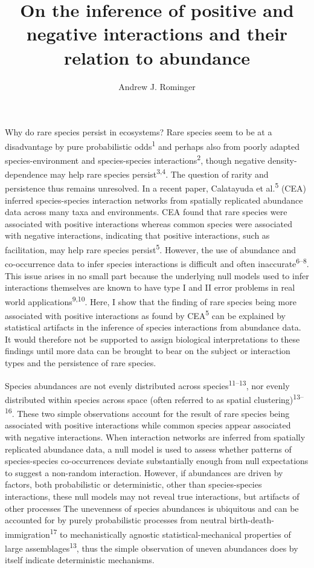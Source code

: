 \documentclass[]{article}
\title{On the inference of positive and negative interactions and their
relation to abundance}
\author{Andrew J. Rominger}
\date{}
\begin{document}
\maketitle

Why do rare species persist in ecosystems? Rare species seem to be at a
disadvantage by pure probabilistic odds\textsuperscript{1} and perhaps
also from poorly adapted species-environment and species-species
interactions\textsuperscript{2}, though negative density-dependence may
help rare species persist\textsuperscript{3,4}. The question of rarity
and persistence thus remains unresolved. In a recent paper, Calatayuda
et al.\textsuperscript{5} (CEA) inferred species-species interaction
networks from spatially replicated abundance data across many taxa and
environments. CEA found that rare species were associated with positive
interactions whereas common species were associated with negative
interactions, indicating that positive interactions, such as
facilitation, may help rare species persist\textsuperscript{5}. However,
the use of abundance and co-occurrence data to infer species
interactions is difficult and often inaccurate\textsuperscript{6--8}.
This issue arises in no small part because the underlying null models
used to infer interactions themselves are known to have type I and II
error problems in real world applications\textsuperscript{9,10}. Here, I
show that the finding of rare species being more associated with
positive interactions as found by CEA\textsuperscript{5} can be
explained by statistical artifacts in the inference of species
interactions from abundance data. It would therefore not be supported to
assign biological interpretations to these findings until more data can
be brought to bear on the subject or interaction types and the
persistence of rare species.

Species abundances are not evenly distributed across
species\textsuperscript{11--13}, nor evenly distributed within species
across space (often referred to as spatial
clustering)\textsuperscript{13--16}. These two simple observations
account for the result of rare species being associated with positive
interactions while common species appear associated with negative
interactions. When interaction networks are inferred from spatially
replicated abundance data, a null model is used to assess whether
patterns of species-species co-occurrences deviate substantially enough
from null expectations to suggest a non-random interaction. However, if
abundances are driven by factors, both probabilistic or deterministic,
other than species-species interactions, these null models may not
reveal true interactions, but artifacts of other processes The
unevenness of species abundances is ubiquitous and can be accounted for
by purely probabilistic processes from neutral
birth-death-immigration\textsuperscript{17} to mechanistically agnostic
statistical-mechanical properties of large
assemblages\textsuperscript{13}, thus the simple observation of uneven
abundances does by itself indicate deterministic mechanisms.
\end{document}
